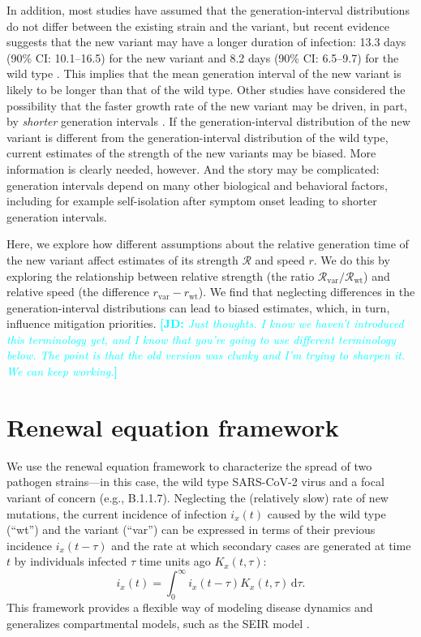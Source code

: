\documentclass[12pt]{article}
\newcommand{\comment}{\showcomment}
\newcommand{\showcomment}[3]{\textcolor{#1}{\textbf{[#2: }\textsl{#3}\textbf{]}}}
\newcommand{\jd}[1]{\comment{cyan}{JD}{#1}}
\newcommand{\rx}[1]{\ensuremath{{r}_{#1}}\xspace}
\newcommand{\ry}[1]{\rx{\mathrm{#1}}}
\newcommand{\Rx}[1]{\ensuremath{{\mathcal R}_{#1}}\xspace}
\newcommand{\Ry}[1]{\Rx{\mathrm{#1}}}
\newcommand{\RR}{\ensuremath{{\mathcal R}}\xspace}
\newcommand{\dd}[1]{\ensuremath{\, \mathrm{d}#1}}
\newcommand{\dtau}{\dd{\tau}}
\begin{document}
In addition, most studies have assumed that the generation-interval distributions do not differ between the existing strain and the variant, but recent evidence suggests that the new variant may have a longer duration of infection: 13.3 days (90\% CI: 10.1--16.5) for the new variant and 8.2 days (90\% CI: 6.5--9.7) for the wild type \citep{kissler2021densely}.
This implies that the mean generation interval of the new variant is likely to be longer than that of the wild type.
Other studies have considered the possibility that the faster growth rate of the new variant may be driven, in part, by \emph{shorter} generation intervals \citep{davies2021estimated,volz2021transmission}.
If the generation-interval distribution of the new variant is different from the generation-interval distribution of the wild type, current estimates of the strength of the new variants may be biased.
More information is clearly needed, however. 
And the story may be complicated: generation intervals depend on many other biological and behavioral factors, including for example self-isolation after symptom onset leading to shorter generation intervals.

Here, we explore how different assumptions about the relative generation time of the new variant affect estimates of its strength $\RR$ and speed $r$.
We do this by exploring the relationship between relative strength (the ratio $\Ry{var}/\Ry{wt}$) and relative speed (the difference $\ry{var}-\ry{wt}$).
We find that neglecting differences in the generation-interval distributions can lead to biased estimates, which, in turn, influence mitigation priorities.
\jd{Just thoughts. I know we haven't introduced this terminology yet, and I know that you're going to use different terminology below. The point is that the old version was clunky and I'm trying to sharpen it. We can keep working.}

\section{Renewal equation framework}

We use the renewal equation framework to characterize the spread of two pathogen strains---in this case, the wild type SARS-CoV-2 virus and a focal variant of concern (e.g., B.1.1.7).
Neglecting the (relatively slow) rate of new mutations, the current incidence of infection $i_x(t)$ caused by the wild type (``wt'') and the variant (``var'') can be expressed in terms of their previous incidence $i_x(t-\tau)$ and the rate at which secondary cases are generated at time $t$ by individuals infected $\tau$ time units ago $K_x(t, \tau)$:
\begin{equation}
i_x(t) = \int_0^\infty i_x(t-\tau) K_x(t, \tau) \dtau.
\end{equation}
This framework provides a flexible way of modeling disease dynamics and generalizes compartmental models, such as the SEIR model \citep{heesterbeek1996concept, diekmann2000mathematical, roberts2004modelling, aldis2005integral, roberts2007model, champredon2018equivalence}.
\end{document}
